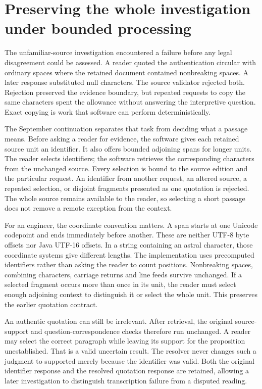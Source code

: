 \section{Preserving the whole investigation under bounded processing}
\label{sec:processing-continuation}

The unfamiliar-source investigation encountered a failure before any legal
disagreement could be assessed. A reader quoted the authentication circular
with ordinary spaces where the retained document contained nonbreaking spaces.
A later response substituted null characters. The source validator rejected
both. Rejection preserved the evidence boundary, but repeated requests to copy
the same characters spent the allowance without answering the interpretive
question. Exact copying is work that software can perform deterministically.

The September continuation separates that task from deciding what a passage
means. Before asking a reader for evidence, the software gives each retained
source unit an identifier. It also offers bounded adjoining spans for longer
units. The reader selects identifiers; the software retrieves the corresponding
characters from the unchanged source. Every selection is bound to the source
edition and the particular request. An identifier from another request, an
altered source, a repeated selection, or disjoint fragments presented as one
quotation is rejected. The whole source remains available to the reader, so
selecting a short passage does not remove a remote exception from the context.

For an engineer, the coordinate convention matters. A span starts at one
Unicode codepoint and ends immediately before another. These are neither UTF-8
byte offsets nor Java UTF-16 offsets. In a string containing an astral character,
those coordinate systems give different lengths. The implementation uses
precomputed identifiers rather than asking the reader to count positions.
Nonbreaking spaces, combining characters, carriage returns and line feeds
survive unchanged. If a selected fragment occurs more than once in its unit,
the reader must select enough adjoining context to distinguish it or select the
whole unit. This preserves the earlier quotation contract.

An authentic quotation can still be irrelevant. After retrieval, the original
source-support and question-correspondence checks therefore run unchanged. A
reader may select the correct paragraph while leaving its support for the
proposition unestablished. That is a valid uncertain result. The resolver never
changes such a judgment to supported merely because the identifier was valid.
Both the original identifier response and the resolved quotation response are
retained, allowing a later investigation to distinguish transcription failure
from a disputed reading.

